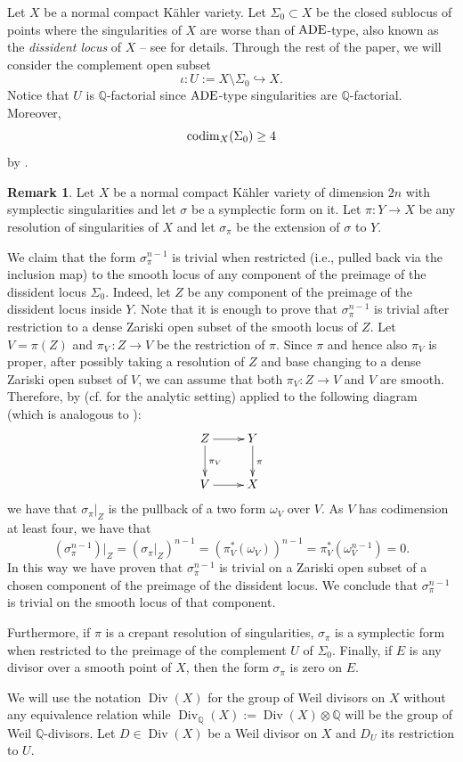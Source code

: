 \documentclass[12pt,reqno]{amsart}
\def\Q{{\mathbb Q}}
\def\codim{\mathop{\rm codim}\nolimits}
\theoremstyle{plain}
\theoremstyle{definition}
\newtheorem{remark}[thm]{Remark}
\begin{document}
Let $X$ be a normal compact K\"ahler variety.  Let $\Sigma_0\subset X$ be the closed sublocus of points where the singularities of $X$ are worse than of ${\rm ADE}$-type, also known as the {\it dissident locus} of $X$  -- see \cite{mark_g2, Nami} for details. Through the rest of the paper, we will consider the complement open subset 
$$
 \iota : U:= X\setminus \Sigma_0 \hookrightarrow X. 
$$
Notice that $U$ is $\Q$-factorial since ${\rm ADE}$-type singularities are $\Q$-factorial. Moreover,
\begin{equation}\label{eq:codim_diss}
\codim_X(\Sigma_0)\geq 4
\end{equation}
by \cite[Proposition 1.6]{Nami}.
\begin{remark}\label{rmk:diss-not-diss}
Let $X$ be a normal compact K\"ahler variety of dimension $2n$ with symplectic singularities and let $\sigma$ be a symplectic form on it. Let $\pi : Y\to X$ be any resolution of singularities of $X$ and let $\sigma_{\pi}$ be the extension of $\sigma$ to $Y$. 

We claim that the form $\sigma_{\pi}^ {n-1}$ is trivial when restricted (i.e., pulled back via the inclusion map) to the smooth locus of any component of the preimage of the dissident locus $\Sigma_0$. Indeed, let $Z$ be any  component of the preimage of the dissident locus inside $Y$. Note that it is enough to prove that $\sigma_{\pi}^{n-1}$ is trivial after restriction to a dense Zariski open subset of the smooth locus of $Z$. Let $V=\pi(Z)$ and $\pi_V\,:Z\to V$ be the restriction of $\pi$. Since $\pi$ and hence also $\pi_V$ is proper, after possibly taking a resolution of $Z$ and base changing to a dense Zariski  open subset of $V$, we can assume that both $\pi_V: Z\to V$ and $V$ are smooth. Therefore, by \cite[Lemma 2.9]{kal} (cf. \cite[Remark 3.6]{BL2} for the analytic setting) applied to the following diagram (which is analogous to \cite[Diagram (2.2)]{kal}):
$$    
\xymatrix{
Z\ar[r]\ar[d]^{\pi_V} & Y\ar[d]^{\pi}\\
V\ar[r] & X}
$$
we have that $\sigma_{\pi}|_{Z}$ is the pullback of a two form $\omega_V$ over $V$. As $V$ has codimension at least four, we have that $$(\sigma_{\pi}^{n-1})|_Z=(\sigma_{\pi}|_Z)^{n-1}=(\pi_V^*(\omega_V))^{n-1}=\pi_V^*(\omega_V^{n-1})=0.$$
In this way we have proven that $\sigma_{\pi}^{n-1}$ is trivial on a Zariski open subset of a chosen component of the preimage of the dissident locus. We conclude that $\sigma_{\pi}^{n-1}$ is trivial on the smooth locus of that component.

Furthermore, if $\pi$ is a crepant resolution of singularities, $\sigma_\pi$ is a symplectic form when restricted to the preimage of the complement $U$ of $\Sigma_0$. Finally, if $E$ is any divisor over a smooth point of $X$, then the form $\sigma_{\pi}$ is zero on $E$. 
\end{remark}
We will use the notation $\operatorname{Div}(X)$ for the group of Weil divisors on $X$ without any equivalence relation while 
$\operatorname{Div}_{\mathbb Q}(X):=\operatorname{Div}(X)\otimes \mathbb Q$ will be the group of Weil $\mathbb Q$-divisors.
Let $D\in \operatorname{Div}(X)$ be a Weil divisor on $X$ and $D_U$ its restriction to $U$. 
\end{document}
